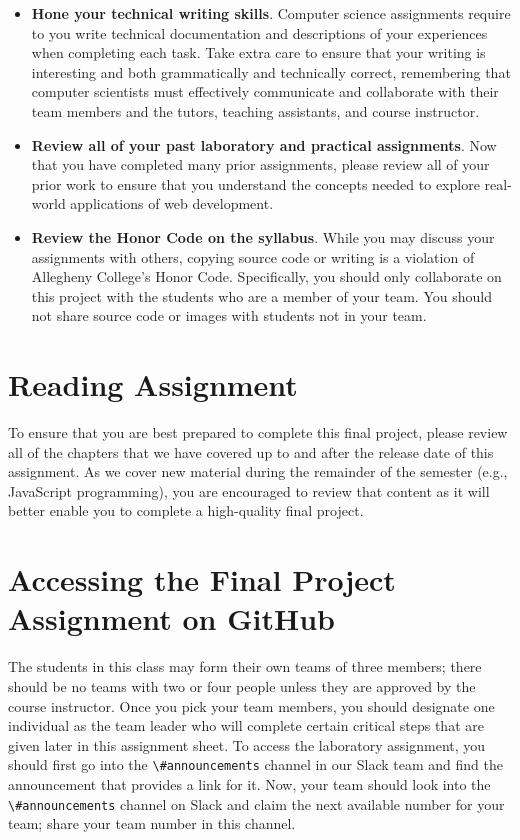 \documentclass[11pt]{article}
\newcommand{\channel}[1]{\lstinline{#1}}
\begin{document}
\begin{itemize}
\item {\bf Hone your technical writing skills}. Computer science assignments
  require to you write technical documentation and descriptions of your
  experiences when completing each task. Take extra care to ensure that your
  writing is interesting and both grammatically and technically correct,
  remembering that computer scientists must effectively communicate and
  collaborate with their team members and the tutors, teaching assistants, and
  course instructor.

\item {\bf Review all of your past laboratory and practical assignments}. Now
  that you have completed many prior assignments, please review all of your
  prior work to ensure that you understand the concepts needed to explore
  real-world applications of web development.

\item {\bf Review the Honor Code on the syllabus}. While you may discuss your
  assignments with others, copying source code or writing is a violation of
  Allegheny College's Honor Code. Specifically, you should only collaborate on
  this project with the students who are a member of your team. You should not
  share source code or images with students not in your team.


\end{itemize}

\vspace*{-.15in}

\section*{Reading Assignment}

To ensure that you are best prepared to complete this final project, please
review all of the chapters that we have covered up to and after the release date
of this assignment. As we cover new material during the remainder of the
semester (e.g., JavaScript programming), you are encouraged to review that
content as it will better enable you to complete a high-quality final project.

\section*{Accessing the Final Project Assignment on GitHub}

The students in this class may form their own teams of three members; there
should be no teams with two or four people unless they are approved by the
course instructor. Once you pick your team members, you should designate one
individual as the team leader who will complete certain critical steps that are
given later in this assignment sheet. To access the laboratory assignment, you
should first go into the \channel{\#announcements} channel in our Slack team and
find the announcement that provides a link for it. Now, your team should look
into the \channel{\#announcements} channel on Slack and claim the next available
number for your team; share your team number in this channel.
\end{document}
